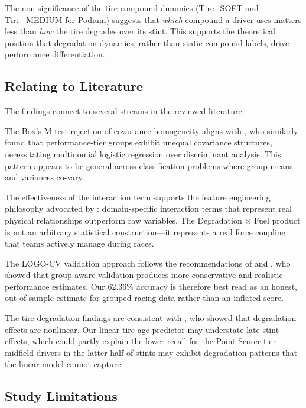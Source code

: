 The non-significance of the tire-compound dummies (Tire\_SOFT and
Tire\_MEDIUM for Podium) suggests that \textit{which} compound a driver uses
matters less than \textit{how} the tire degrades over its stint. This
supports the theoretical position that degradation dynamics, rather than
static compound labels, drive performance differentiation.

\subsection{Relating to Literature}

The findings connect to several streams in the reviewed literature.

The Box's M test rejection of covariance homogeneity aligns with
\textcite{mendoza2023}, who similarly found that performance-tier groups
exhibit unequal covariance structures, necessitating multinomial logistic
regression over discriminant analysis. This pattern appears to be general
across classification problems where group means and variances co-vary.

The effectiveness of the interaction term supports the feature engineering
philosophy advocated by \textcite{santos2020}: domain-specific interaction
terms that represent real physical relationships outperform raw variables.
The Degradation $\times$ Fuel product is not an arbitrary statistical
construction---it represents a real force coupling that teams actively manage
during races.

The LOGO-CV validation approach follows the recommendations of
\textcite{varoquaux2019} and \textcite{wong2023}, who showed that
group-aware validation produces more conservative and realistic performance
estimates. Our 62.36\% accuracy is therefore best read as an honest,
out-of-sample estimate for grouped racing data rather than an inflated score.

The tire degradation findings are consistent with \textcite{baldi2022}, who
showed that degradation effects are nonlinear. Our linear tire age predictor
may understate late-stint effects, which could partly explain the lower
recall for the Point Scorer tier---midfield drivers in the latter half of
stints may exhibit degradation patterns that the linear model cannot capture.

\subsection{Study Limitations}

